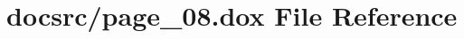 \hypertarget{page__08_8dox}{\section{docsrc/page\-\_\-08.dox File Reference}
\label{page__08_8dox}
}

